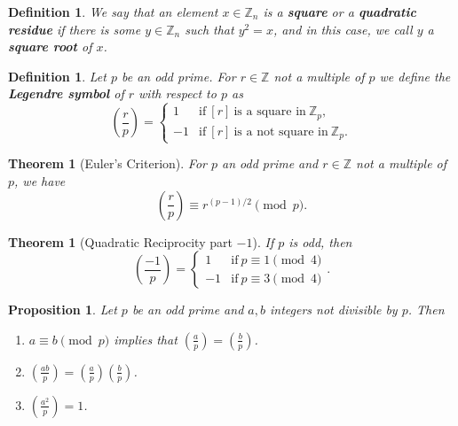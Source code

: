 \documentclass[12pt]{amsart}
\newcommand{\Z}{\mathbb{Z}}
\numberwithin{equation}{section}
\theoremstyle{plain} %
\newtheorem{thm}	[section]	{Theorem}
\newtheorem{prop}	[section]	{Proposition}
\newtheorem{defn}	[section]	{Definition}
\begin{document}
\begin{defn}
We say that an element $x\in \Z_n$ is a \textbf{square} or a \textbf{quadratic residue} if there is some $y\in \Z_n$ such that $y^2=x$, and in this case, we call $y$ a \textbf{square root} of $x$. 
\end{defn}

\begin{defn} Let $p$ be an odd prime. For $r\in \Z$ not a multiple of $p$ we define the \textbf{Legendre symbol}  of $r$ with respect to $p$ as 
\[ \left( \frac{r}{p} \right) = \begin{cases} 1 & \text{if} \ [r] \ \text{is a square in} \ \Z_p, \\ -1 & \text{if} \ [r] \ \text{is a not square in} \ \Z_p. \end{cases}\]
\end{defn}


\begin{thm}[Euler's Criterion] 
 For $p$ an odd prime and $r\in \Z$ not a multiple of $p$, we have
\[\displaystyle \left( \frac{r}{p} \right) \equiv r^{(p-1)/2} \pmod p.\]
\end{thm}



\begin{thm}[Quadratic Reciprocity part $-1$] If $p$ is odd, then
\[ \left( \frac{-1}{p} \right) = \begin{cases} 1 &\text{if} \ p\equiv 1 \pmod 4\\ -1 &\text{if} \ p\equiv 3 \pmod 4\end{cases}.\]
\end{thm}


\begin{prop} Let $p$ be an odd prime and $a,b$ integers not divisible by $p$. Then
\begin{enumerate}
\item $\displaystyle a\equiv b \pmod{p}$ implies that $\displaystyle \left(\frac{a}{p}\right) = \left(\frac{b}{p}\right)$.
\item $\displaystyle\left(\frac{ab}{p}\right) = \left(\frac{a}{p}\right) \left(\frac{b}{p}\right)$.
\item $\displaystyle\left(\frac{a^2}{p}\right) = 1$.
\end{enumerate}
\end{prop}
\end{document}
